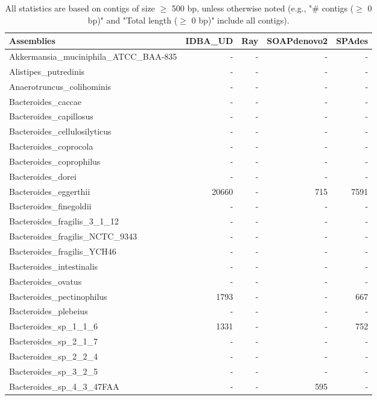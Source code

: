 \documentclass[12pt,a4paper]{article}
\begin{document}
\begin{table}[ht]
\begin{center}
\caption{All statistics are based on contigs of size $\geq$ 500 bp, unless otherwise noted (e.g., "\# contigs ($\geq$ 0 bp)" and "Total length ($\geq$ 0 bp)" include all contigs).}
\begin{tabular}{|l*{4}{|r}|}
\hline
Assemblies & IDBA\_UD & Ray & SOAPdenovo2 & SPAdes \\ \hline
Akkermansia\_muciniphila\_ATCC\_BAA-835 & - & - & - & - \\ \hline
Alistipes\_putredinis & - & - & - & - \\ \hline
Anaerotruncus\_colihominis & - & - & - & - \\ \hline
Bacteroides\_caccae & - & - & - & - \\ \hline
Bacteroides\_capillosus & - & - & - & - \\ \hline
Bacteroides\_cellulosilyticus & - & - & - & - \\ \hline
Bacteroides\_coprocola & - & - & - & - \\ \hline
Bacteroides\_coprophilus & - & - & - & - \\ \hline
Bacteroides\_dorei & - & - & - & - \\ \hline
Bacteroides\_eggerthii & 20660 & - & 715 & 7591 \\ \hline
Bacteroides\_finegoldii & - & - & - & - \\ \hline
Bacteroides\_fragilis\_3\_1\_12 & - & - & - & - \\ \hline
Bacteroides\_fragilis\_NCTC\_9343 & - & - & - & - \\ \hline
Bacteroides\_fragilis\_YCH46 & - & - & - & - \\ \hline
Bacteroides\_intestinalis & - & - & - & - \\ \hline
Bacteroides\_ovatus & - & - & - & - \\ \hline
Bacteroides\_pectinophilus & 1793 & - & - & 667 \\ \hline
Bacteroides\_plebeius & - & - & - & - \\ \hline
Bacteroides\_sp\_1\_1\_6 & 1331 & - & - & 752 \\ \hline
Bacteroides\_sp\_2\_1\_7 & - & - & - & - \\ \hline
Bacteroides\_sp\_2\_2\_4 & - & - & - & - \\ \hline
Bacteroides\_sp\_3\_2\_5 & - & - & - & - \\ \hline
Bacteroides\_sp\_4\_3\_47FAA & - & - & 595 & - \\ \hline

\end{tabular}
\end{center}
\end{table}
\end{document}
